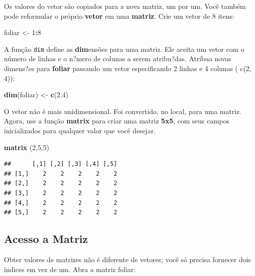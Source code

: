 \documentclass[]{book}
\newenvironment{Shaded}{\begin{snugshade}}{\end{snugshade}}
\newcommand{\DecValTok}[1]{\textcolor[rgb]{0.00,0.00,0.81}{#1}}
\newcommand{\KeywordTok}[1]{\textcolor[rgb]{0.13,0.29,0.53}{\textbf{#1}}}
\newcommand{\NormalTok}[1]{#1}
\newcommand{\OperatorTok}[1]{\textcolor[rgb]{0.81,0.36,0.00}{\textbf{#1}}}
\newcommand{\StringTok}[1]{\textcolor[rgb]{0.31,0.60,0.02}{#1}}
\begin{document}
Os valores do vetor são copiados para a nova matriz, um por um. Você também pode reformular o próprio \textbf{vetor} em uma \textbf{matriz}. Crie um vetor de 8 itens:

\begin{Shaded}
\begin{Highlighting}[]
\NormalTok{foliar <-}\StringTok{ }\DecValTok{1}\OperatorTok{:}\DecValTok{8}
\end{Highlighting}
\end{Shaded}

A função \texttt{dim} define as \textbf{dim}ensões para uma matriz. Ele aceita um vetor com o número de linhas e o n?mero de colunas a serem atribu?das.
Atribua novas dimens?es para \textbf{foliar} passando um vetor especificando 2 linhas e 4 colunas ( c(2, 4)):

\begin{Shaded}
\begin{Highlighting}[]
\KeywordTok{dim}\NormalTok{(foliar) <-}\StringTok{ }\KeywordTok{c}\NormalTok{(}\DecValTok{2}\NormalTok{,}\DecValTok{4}\NormalTok{)}
\end{Highlighting}
\end{Shaded}

O vetor não é mais unidimensional. Foi convertido, no local, para uma matriz.
Agora, use a função \textbf{matrix} para criar uma matriz \textbf{5x5}, com seus campos inicializados para qualquer valor que você desejar.

\begin{Shaded}
\begin{Highlighting}[]
\KeywordTok{matrix}\NormalTok{ (}\DecValTok{2}\NormalTok{,}\DecValTok{5}\NormalTok{,}\DecValTok{5}\NormalTok{)}
\end{Highlighting}
\end{Shaded}

\begin{verbatim}
##      [,1] [,2] [,3] [,4] [,5]
## [1,]    2    2    2    2    2
## [2,]    2    2    2    2    2
## [3,]    2    2    2    2    2
## [4,]    2    2    2    2    2
## [5,]    2    2    2    2    2
\end{verbatim}

\hypertarget{acesso-a-matriz}{%
\subsection{Acesso a Matriz}\label{acesso-a-matriz}}

Obter valores de matrizes não é diferente de vetores; você só precisa fornecer dois índices em vez de um. Abra a matriz foliar:
\end{document}
